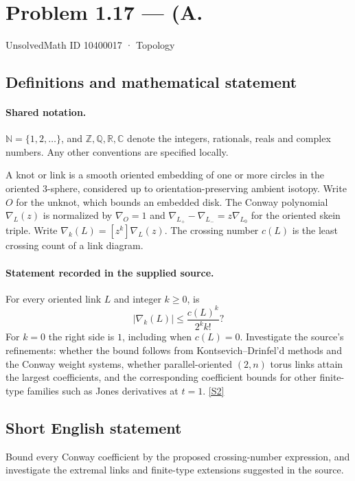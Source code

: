 \documentclass[11pt]{article}
\newcommand{\sref}[2]{\hyperlink{source:#1:#2}{[S#2]}}
\begin{document}
\setcounter{section}{10400016}
\section{Problem 1.17 — (A.}\label{10400017}
{\small\sffamily UnsolvedMath ID 10400017 · Topology}
\subsection{Definitions and mathematical statement}

\paragraph{Shared notation.}$\mathbb N=\{1,2,\ldots\}$, and $\mathbb Z,\mathbb Q,\mathbb R,\mathbb C$ denote the integers, rationals, reals and complex numbers. Any other conventions are specified locally.


A knot or link is a smooth oriented embedding of one or more circles in the oriented $3$-sphere, considered up to orientation-preserving ambient isotopy. Write $O$ for the unknot, which bounds an embedded disk. The Conway polynomial $\nabla_L(z)$ is normalized by $\nabla_O=1$ and $\nabla_{L_+}-\nabla_{L_-}=z\nabla_{L_0}$ for the oriented skein triple. Write $\nabla_k(L)=[z^k]\nabla_L(z)$. The crossing number $c(L)$ is the least crossing count of a link diagram.
\paragraph{Statement recorded in the supplied source.}
For every oriented link $L$ and integer $k\ge0$, is
\[|\nabla_k(L)|\le \frac{c(L)^k}{2^k k!}?\]
For $k=0$ the right side is $1$, including when $c(L)=0$. Investigate the source's refinements: whether the bound follows from Kontsevich--Drinfel'd methods and the Conway weight systems, whether parallel-oriented $(2,n)$ torus links attain the largest coefficients, and the corresponding coefficient bounds for other finite-type families such as Jones derivatives at $t=1$. \sref{10400017}{2}
\subsection{Short English statement}
Bound every Conway coefficient by the proposed crossing-number expression, and investigate the extremal links and finite-type extensions suggested in the source.
\end{document}
